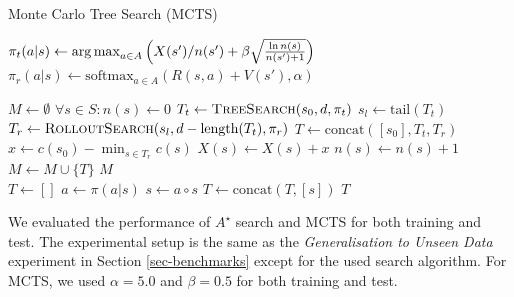 \documentclass[fullpage,twocolumn]{article} %
\begin{document}
\begin{algorithm}[t]
\caption{Monte Carlo Tree Search (MCTS)}
\begin{algorithmic}
    \State $\pi_t(a|s) \leftarrow \operatorname*{arg\,max}_{a \in A}\left( X(s') / n(s') + \beta \sqrt{ \frac{\ln n(s)}{n(s') + 1}} \right)$
    \State $\pi_r(a|s) \leftarrow \text{softmax}_{a \in A}( R(s, a) + V(s'), \alpha)$
    
    \State $M \leftarrow \emptyset$
    \State $\forall s \in S: n(s) \leftarrow 0$ 
        \State $T_t \leftarrow \textsc{TreeSearch}(s_0, d, \pi_t)$
        \State $s_l \leftarrow \text{tail}(T_t)$
        \State $T_r \leftarrow \textsc{RolloutSearch}(s_l, d - \text{length}(T_t), \pi_r)$
        \State $T \leftarrow \text{concat}([s_0], T_t, T_r)$
        \State $x \leftarrow c(s_0) - \min_{s \in T_r} c(s)$ 
            \State $X(s) \leftarrow X(s) + x$
            \State $n(s) \leftarrow n(s) + 1$
        \EndFor
        \State $M \leftarrow M \cup \{T\}$
    \EndWhile
    \State \Return $M$
    \EndFunction
    \\
        \State $T \leftarrow []$
            \State $a \leftarrow \pi(a | s)$ 
            \State $s \leftarrow a \circ s$
            \State $T \leftarrow \text{concat}(T, [s])$      
        \EndWhile
        \State \Return $T$
    \EndFunction
\end{algorithmic}
\label{lst:mcts}
\end{algorithm}


We evaluated the performance of $A^\star$ search and MCTS for both training and test. The experimental setup is the same as the \emph{Generalisation to Unseen Data} experiment in Section \ref{sec-benchmarks} except for the used  search algorithm. For MCTS, we used $\alpha=5.0$ and $\beta=0.5$ for both training and test. 
\end{document}
